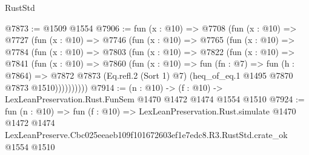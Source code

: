 \begin{lexlean}{RustStd}
\begin{coremodule}
@7873 := @1509 @1554
@7906 := fun (x : @10) =>
  @7708
    (fun (x : @10) =>
    @7727
      (fun (x : @10) =>
      @7746
        (fun (x : @10) =>
        @7765
          (fun (x : @10) =>
          @7784
            (fun (x : @10) =>
            @7803
              (fun (x : @10) =>
              @7822
                (fun (x : @10) =>
                @7841
                  (fun (x : @10) =>
                  @7860
                    (fun (x : @10) =>
                    fun (fn : @7) =>
                    fun (h : @7864) =>
                    @7872
                      @7873
                      (Eq.refl.{2} (Sort 1) @7)
                      (heq_of_eq.{1} @1495 @7870 @7873 @1510))))))))))
@7914 := (n : @10) -> (f : @10) -> LexLeanPreservation.Rust.FunSem @1470 @1472 @1474 @1554 @1510
@7924 := fun (n : @10) =>
  fun (f : @10) =>
  LexLeanPreservation.Rust.simulate
    @1470
    @1472
    @1474
    LexLeanPreserve.Cbc025eeaeb109f101672603ef1e7edc8.R3.RustStd.crate_ok
    @1554
    @1510
\end{coremodule}
\end{lexlean}
